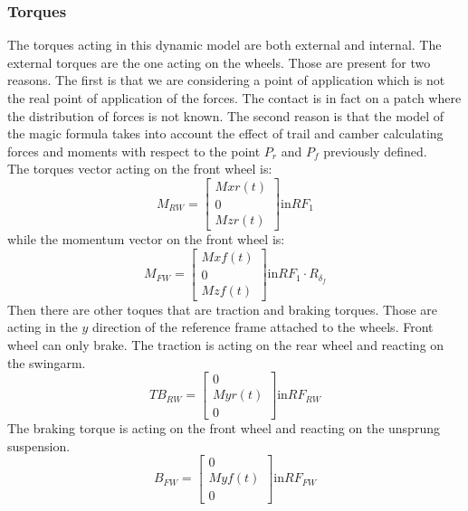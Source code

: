 \subsubsection{Torques}
%
The torques acting in this dynamic model are both external and internal.
The external torques are the one acting on the wheels. Those are present for two reasons. The first is that we are considering a point of application which is not the real point of application of the forces. The contact is in fact on a patch where the distribution of forces is not known. The second reason is that the model of the magic formula \cite{pacejka2006tyre} takes into account the effect of trail and camber calculating forces and moments with respect to the point $P_r$ and $P_f$ previously defined.\\
The torques vector acting on the front wheel is:
%
\begin{equation}
    M_{RW} = 
    \left[
    \begin{array}{c}
        Mxr(t)\\
        0\\
        Mzr(t)
    \end{array}
    \right ]
    \text{in} RF_1
\end{equation}
%
while the momentum vector on the front wheel is:
%
\begin{equation}
    M_{FW} = 
    \left[
    \begin{array}{c}
        Mxf(t)\\
        0\\
        Mzf(t)
    \end{array}
    \right ]
    \text{in} RF_1 \cdot R_{\delta_f}
\end{equation}
%
Then there are other toques that are traction and braking torques. Those are acting in the $y$ direction of the reference frame attached to the wheels. Front wheel can only brake.
The traction is acting on the rear wheel and reacting on the swingarm.
%
\begin{equation}
    TB_{RW} = 
    \left[
    \begin{array}{c}
        0\\
        Myr(t)\\
        0
    \end{array}
    \right ]
    \text{in} RF_{RW}
\end{equation}
%
The braking torque is acting on the front wheel and reacting on the unsprung suspension.
%
\begin{equation}
    B_{FW} = 
    \left[
    \begin{array}{c}
        0\\
        Myf(t)\\
        0
    \end{array}
    \right ]
    \text{in} RF_{FW}
\end{equation}
